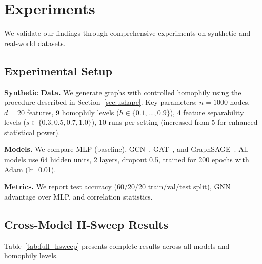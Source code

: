 
\section{Experiments}
\label{sec:experiments}

We validate our findings through comprehensive experiments on synthetic and real-world datasets.

\subsection{Experimental Setup}

\textbf{Synthetic Data.} We generate graphs with controlled homophily using the procedure described in Section~\ref{sec:ushape}. Key parameters: $n=1000$ nodes, $d=20$ features, 9 homophily levels ($h \in \{0.1, ..., 0.9\}$), 4 feature separability levels ($s \in \{0.3, 0.5, 0.7, 1.0\}$), 10 runs per setting (increased from 5 for enhanced statistical power).

\textbf{Models.} We compare MLP (baseline), GCN~\cite{kipf2017gcn}, GAT~\cite{velivckovic2018gat}, and GraphSAGE~\cite{hamilton2017graphsage}. All models use 64 hidden units, 2 layers, dropout 0.5, trained for 200 epochs with Adam (lr=0.01).

\textbf{Metrics.} We report test accuracy (60/20/20 train/val/test split), GNN advantage over MLP, and correlation statistics.

\subsection{Cross-Model H-Sweep Results}

Table~\ref{tab:full_hsweep} presents complete results across all models and homophily levels.

